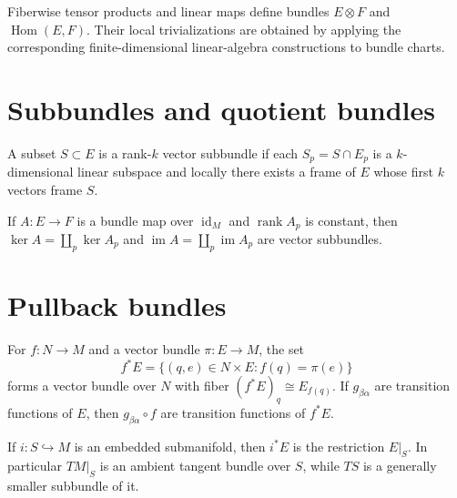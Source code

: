 \begin{proposition}\label{prop:vii07-tensor-hom}
Fiberwise tensor products and linear maps define bundles \(E\otimes F\) and \(\operatorname{Hom}(E,F)\). Their local trivializations are obtained by applying the corresponding finite-dimensional linear-algebra constructions to bundle charts.
\end{proposition}

\section{Subbundles and quotient bundles}
\begin{definition}\label{def:vii07-subbundle}
A subset \(S\subset E\) is a rank-\(k\) vector subbundle if each \(S_p=S\cap E_p\) is a \(k\)-dimensional linear subspace and locally there exists a frame of \(E\) whose first \(k\) vectors frame \(S\).
\end{definition}

\begin{proposition}\label{prop:vii07-kernel-subbundle}
If \(A:E\to F\) is a bundle map over \(\operatorname{id}_M\) and \(\operatorname{rank}A_p\) is constant, then \(\ker A=\coprod_p\ker A_p\) and \(\operatorname{im}A=\coprod_p\operatorname{im}A_p\) are vector subbundles.
\end{proposition}

\section{Pullback bundles}
\begin{theorem}\label{thm:vii07-pullback}
For \(f:N\to M\) and a vector bundle \(\pi:E\to M\), the set
\[
f^*E=\{(q,e)\in N\times E:f(q)=\pi(e)\}
\]
forms a vector bundle over \(N\) with fiber \((f^*E)_q\cong E_{f(q)}\). If \(g_{\beta\alpha}\) are transition functions of \(E\), then \(g_{\beta\alpha}\circ f\) are transition functions of \(f^*E\).
\end{theorem}

\begin{example}[Restriction]\label{ex:vii07-restriction}
If \(i:S\hookrightarrow M\) is an embedded submanifold, then \(i^*E\) is the restriction \(E|_S\). In particular \(TM|_S\) is an ambient tangent bundle over \(S\), while \(TS\) is a generally smaller subbundle of it.
\end{example}

